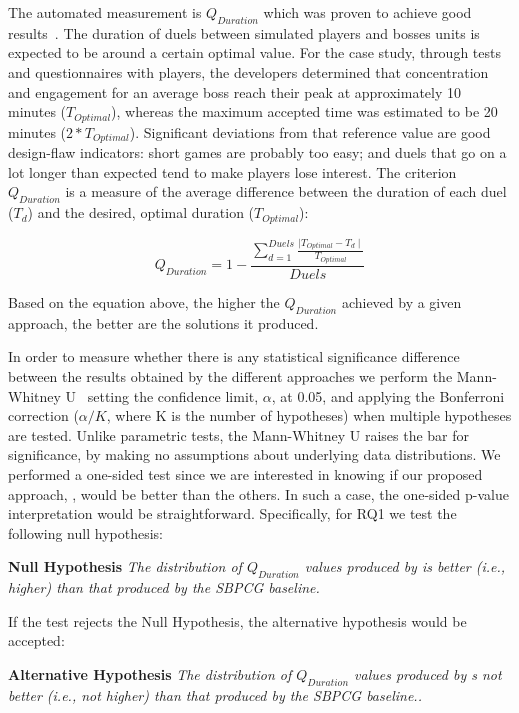 The automated measurement is $Q_{Duration}$ which was proven to achieve good results~\cite{browne2010evolutionary}. The duration of duels between simulated players and bosses units is expected to be around a certain optimal value. For the \CaseStudy{} case study, through tests and questionnaires with players, the developers determined that concentration and engagement for an average boss reach their peak at approximately 10 minutes ($T_{Optimal}$), whereas the maximum accepted time was estimated to be 20 minutes ($2*T_{Optimal}$). Significant deviations from that reference value are good design-flaw indicators: short games are probably too easy; and duels that go on a lot longer than expected tend to make players lose interest. The criterion $Q_{Duration}$ is a measure of the average difference between the duration of each duel ($T_{d}$) and the desired, optimal duration ($T_{Optimal}$):

\begin{equation}
    Q_{Duration} =  1 - \frac{\sum\limits_{d=1}^{Duels}\frac{\mid T_{Optimal} - T_{d} \mid}{T_{Optimal}}}{Duels} 
\end{equation}

Based on the equation above, the higher the $Q_{Duration}$ achieved by a given approach, the better are the solutions it produced.

In order to measure whether there is any statistical significance difference between the results obtained by the different approaches we perform the Mann-Whitney U~\cite{mann1947test} setting the confidence limit, $\alpha$, at 0.05, and applying the Bonferroni correction ($\alpha/K$, where K is the number of hypotheses) when multiple hypotheses are tested.  
Unlike parametric tests, the Mann-Whitney U raises the bar for significance, by making no assumptions about underlying data distributions. We performed a one-sided test since we are interested in knowing if our proposed approach, \simhotep{}, would be better than the others. In such a case, the one-sided p-value interpretation would be straightforward. Specifically, for RQ1 we test the following null hypothesis: 

\textbf{Null Hypothesis}
\textit{The distribution of $Q_{Duration}$ values produced by  \simhotep{}  is better (i.e., higher) than that produced by the SBPCG baseline.}

If the test rejects the Null Hypothesis, the alternative hypothesis would be accepted:

\textbf{Alternative Hypothesis}
\textit{The distribution of $Q_{Duration}$ values produced by \simhotep{} s not better (i.e., not higher) than that produced by the SBPCG baseline..}

